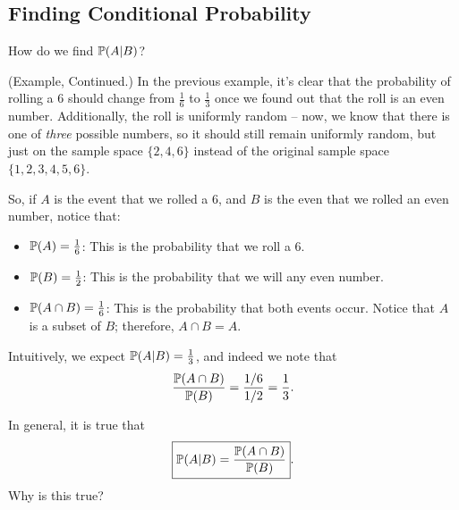 \subsection{Finding Conditional Probability}
How do we find $\mathbb{P}(A | B)$? 
\begin{mdframed}[]
    (Example, Continued.) In the previous example, it's clear that the probability of rolling a 6 should change from $\frac{1}{6}$ to $\frac{1}{3}$ once we found out that the roll is an even number. Additionally, the roll is uniformly random -- now, we know that there is one of \emph{three} possible numbers, so it should still remain uniformly random, but just on the sample space $\{2, 4, 6\}$ instead of the original sample space $\{1, 2, 3, 4, 5, 6\}$. 

    \bigskip 

    So, if $A$ is the event that we rolled a 6, and $B$ is the even that we rolled an even number, notice that: 
    \begin{itemize}
        \item $\mathbb{P}(A) = \frac{1}{6}$: This is the probability that we roll a 6.
        \item $\mathbb{P}(B) = \frac{1}{2}$: This is the probability that we will any even number.
        \item $\mathbb{P}(A \cap B) = \frac{1}{6}$: This is the probability that both events occur. Notice that $A$ is a subset of $B$; therefore, $A \cap B = A$. 
    \end{itemize}
    Intuitively, we expect $\mathbb{P}(A | B) = \frac{1}{3}$, and indeed we note that 
    \[\frac{\mathbb{P}(A \cap B)}{\mathbb{P}(B)} = \frac{1 / 6}{1 / 2} = \frac{1}{3}.\]
\end{mdframed}
In general, it is true that 
\[\boxed{\mathbb{P}(A | B) = \frac{\mathbb{P}(A \cap B)}{\mathbb{P}(B)}}.\]
Why is this true? 
